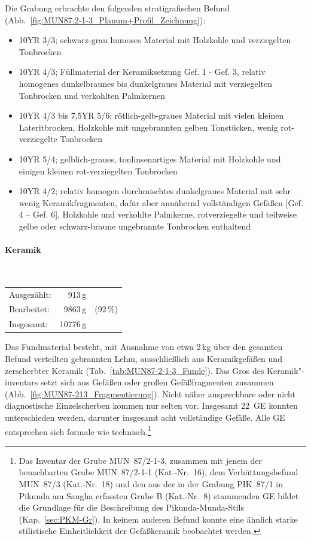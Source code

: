\noindent Die Grabung erbrachte den folgenden stratigrafischen Befund (Abb.~\ref{fig:MUN87.2-1-3_Planum+Profil_Zeichnung}):
\begin{itemize}[leftmargin=*, labelindent=1.25em, noitemsep, topsep=0pt]
	\item [(1)] 10YR 3/3; schwarz-grau humoses Material mit Holzkohle und verziegelten Tonbrocken
	\item [(2)] 10YR 4/3; Füllmaterial der Keramiksetzung Gef. 1 - Gef. 3, relativ homogenes dunkelbraunes bis dunkelgraues Material mit verziegelten Tonbrocken und verkohlten Palmkernen
	\item [(3)] 10YR 4/3 bis 7,5YR 5/6; rötlich-gelb-graues Material mit vielen kleinen Lateritbrocken, Holzkohle mit ungebrannten gelben Tonstücken, wenig rot-verziegelte Tonbrocken
	\item [(4)] 10YR 5/4; gelblich-graues, tonlinsenartiges Material mit Holzkohle und einigen kleinen rot-verziegelten Tonbrocken
	\item [(5)] 10YR 4/2; relativ homogen durchmischtes dunkelgraues Material mit sehr wenig Keramikfragmenten, dafür aber annähernd vollständigen Gefäßen [Gef. 4 – Gef. 6], Holzkohle und verkohlte Palmkerne, rotverziegelte und teilweise gelbe oder schwarz-braune ungebrannte Tonbrocken enthaltend
\end{itemize}

\columnbreak
\paragraph{Keramik\vspace{.5em}}\mbox{}\\
\begin{tabular}{@{}lrl@{}}
Ausgezählt: & 913\,g & \\ 
Bearbeitet: & 9863\,g & (92\,\%) \\ 
Insgesamt: & 10776\,g & \\ 
\end{tabular}

\vspace{1em}
\noindent Das Fundmaterial besteht, mit Ausnahme von etwa 2\,kg über den gesamten Befund verteilten gebrannten Lehm, ausschließlich aus Keramikgefäßen und zerscherbter Keramik (Tab.~\ref{tab:MUN87-2-1-3_Funde}). Das Gros des Keramik"-inventars setzt sich aus Gefäßen oder großen Gefäßfragmenten zusammen (Abb.~\ref{fig:MUN87-213_Fragmentierung}). Nicht näher ansprechbare oder nicht diagnostische Einzelscherben kommen nur selten vor. Insgesamt 22~GE konnten unterschieden werden, darunter insgesamt acht vollständige Gefäße. Alle GE entsprechen sich formale wie technisch.\footnote{Das Inventar der Grube MUN~87/2-1-3, zusammen mit jenem der benachbarten Grube MUN~87/2-1-1 (Kat.-Nr.~16), dem Verhüttungsbefund MUN~87/3 (Kat.-Nr.~18) und den aus der in der Grabung PIK~87/1 in Pikunda am \mbox{Sangha} erfassten Grube B (Kat.-Nr.~8) stammenden GE bildet die Grundlage für die Beschreibung des Pikunda-Munda-Stils (Kap.~\ref{sec:PKM-Gr}). In keinem anderen Befund konnte eine ähnlich starke stilistische Einheitlichkeit der Gefäßkeramik beobachtet werden.}

